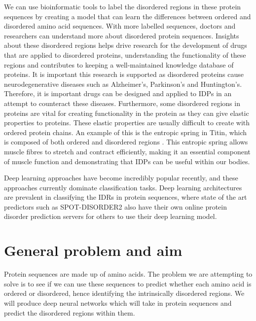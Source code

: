 \documentclass{l4proj}
\begin{document}
We can use bioinformatic tools to label the disordered regions in these protein sequences by creating a model that can learn the differences between ordered and disordered amino acid sequences. With more labelled sequences, doctors and researchers can understand more about disordered protein sequences. Insights about these disordered regions helps drive research for the development of drugs that are applied to disordered proteins, understanding the functionality of these regions and contributes to keeping a well-maintained knowledge database of proteins. It is important this research is supported as disordered proteins cause neurodegenerative diseases such as Alzheimer’s, Parkinson’s and Huntington’s. Therefore, it is important drugs can be designed and applied to IDPs in an attempt to counteract these diseases. Furthermore, some disordered regions in proteins are vital for creating functionality in the protein as they can give elastic properties to proteins. These elastic properties are usually difficult to create with ordered protein chains. An example of this is the entropic spring in Titin, which is composed of both ordered and disordered regions \citep{Morgan:17}. This entropic spring allows muscle fibres to stretch and contract efficiently, making it an essential component of muscle function and demonstrating that IDPs can be useful within our bodies.

Deep learning approaches have become incredibly popular recently, and these approaches currently dominate classification tasks. Deep learning architectures are prevalent in classifying the IDRs in protein sequences, where state of the art predictors such as SPOT-DISORDER2 \citep{Hanson:19} also have their own online protein disorder prediction servers for others to use their deep learning model.

\section{General problem and aim}

Protein sequences are made up of amino acids. The problem we are attempting to solve is to see if we can use these sequences to predict whether each amino acid is ordered or disordered, hence identifying the intrinsically disordered regions. We will produce deep neural networks which will take in protein sequences and predict the disordered regions within them. 
\end{document}
